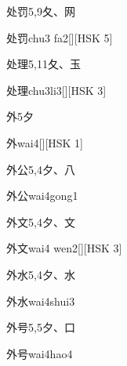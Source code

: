 \begin{entry}{处罚}{5,9}{⼡、⽹}
  \begin{phonetics}{处罚}{chu3 fa2}[][HSK 5]
  \end{phonetics}
\end{entry}

\begin{entry}{处理}{5,11}{⼡、⽟}
  \begin{phonetics}{处理}{chu3li3}[][HSK 3]
  \end{phonetics}
\end{entry}

\begin{entry}{外}{5}{⼣}
  \begin{phonetics}{外}{wai4}[][HSK 1]
  \end{phonetics}
\end{entry}

\begin{entry}{外公}{5,4}{⼣、⼋}
  \begin{phonetics}{外公}{wai4gong1}
  \end{phonetics}
\end{entry}

\begin{entry}{外文}{5,4}{⼣、⽂}
  \begin{phonetics}{外文}{wai4 wen2}[][HSK 3]
  \end{phonetics}
\end{entry}

\begin{entry}{外水}{5,4}{⼣、⽔}
  \begin{phonetics}{外水}{wai4shui3}
  \end{phonetics}
\end{entry}

\begin{entry}{外号}{5,5}{⼣、⼝}
  \begin{phonetics}{外号}{wai4hao4}
  \end{phonetics}
\end{entry}

